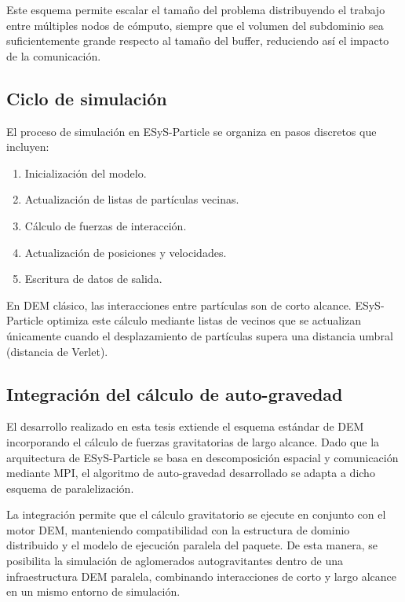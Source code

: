 \documentclass[a4paper,11pt]{book}
\begin{document}
Este esquema permite escalar el tamaño del problema distribuyendo el trabajo entre múltiples nodos de cómputo, siempre que el volumen del subdominio sea suficientemente grande respecto al tamaño del buffer, reduciendo así el impacto de la comunicación.

\subsection{Ciclo de simulación}

El proceso de simulación en ESyS-Particle se organiza en pasos discretos que incluyen:

\begin{enumerate}
	\item Inicialización del modelo.
	\item Actualización de listas de partículas vecinas.
	\item Cálculo de fuerzas de interacción.
	\item Actualización de posiciones y velocidades.
	\item Escritura de datos de salida.
\end{enumerate}

En DEM clásico, las interacciones entre partículas son de corto alcance. ESyS-Particle optimiza este cálculo mediante listas de vecinos que se actualizan únicamente cuando el desplazamiento de partículas supera una distancia umbral (distancia de Verlet).

\subsection{Integración del cálculo de auto-gravedad}

El desarrollo realizado en esta tesis extiende el esquema estándar de DEM incorporando el cálculo de fuerzas gravitatorias de largo alcance. Dado que la arquitectura de ESyS-Particle se basa en descomposición espacial y comunicación mediante MPI, el algoritmo de auto-gravedad desarrollado se adapta a dicho esquema de paralelización.

La integración permite que el cálculo gravitatorio se ejecute en conjunto con el motor DEM, manteniendo compatibilidad con la estructura de dominio distribuido y el modelo de ejecución paralela del paquete. De esta manera, se posibilita la simulación de aglomerados autogravitantes dentro de una infraestructura DEM paralela, combinando interacciones de corto y largo alcance en un mismo entorno de simulación.
\end{document}
